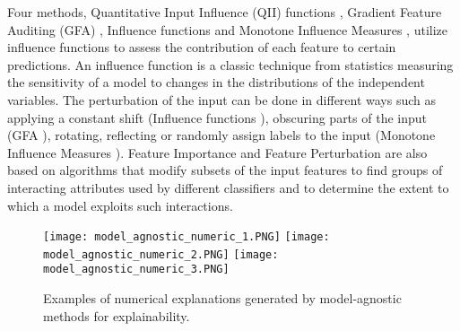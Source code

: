 \documentclass[final,1p,times]{elsarticle}
\begin{document}
Four methods, Quantitative Input Influence (QII) functions \cite{datta2016algorithmic}, Gradient Feature Auditing (GFA) \cite{adler2018auditing}, Influence functions \cite{koh2017understanding} and Monotone Influence Measures \cite{sliwinski2017characterization}, utilize influence functions to assess the contribution of each feature to certain predictions. An influence function is a classic technique from statistics \cite{koh2017understanding} measuring the sensitivity of a model to changes in the distributions of the independent variables. The perturbation of the input can be done in different ways such as applying a constant shift (Influence functions \cite{koh2017understanding}), obscuring parts of the input (GFA \cite{adler2018auditing}), rotating, reflecting or randomly assign labels to the input (Monotone Influence Measures \cite{sliwinski2017characterization}).
Feature Importance \cite{henelius2014peek} and Feature Perturbation \cite{vstrumbelj2014explaining} are also based on algorithms that modify subsets of the input features to find groups of interacting attributes used by different classifiers and to determine the extent to which a model exploits such interactions.\\

\begin{figure}[!ht]
\begin{minipage}{\textwidth}
\centering
    {\texttt{[image: model\_agnostic\_numeric\_1.PNG]}}
    {\texttt{[image: model\_agnostic\_numeric\_2.PNG]}}
    {\texttt{[image: model\_agnostic\_numeric\_3.PNG]}}
  \caption{Examples of numerical explanations generated by model-agnostic methods for explainability.}
  \label{fig:model_agnostic_numeric}
\end{minipage}
\end{figure}

\newpage
\end{document}
